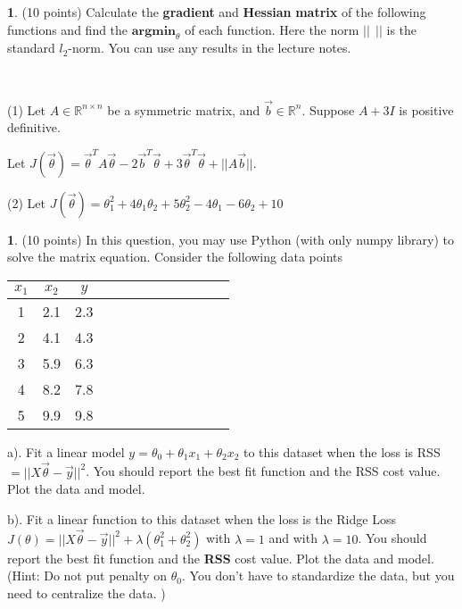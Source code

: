 \documentclass[11pt]{paper}
\theoremstyle{definition}
\newtheorem{Question}[theorem]{ }
\newcommand{\Qu}[1]{
\begin{Question}
#1
\end{Question}
\vspace{-0.5cm}
}
\newcommand{\R}{\mathbb{R}}
\newcommand{\vb}{\vec{b}}
\newcommand{\vy}{\vec{y}}
\begin{document}
 
 


\newpage
\setcounter{page}{1}

\pagestyle{plain} 

 

\Qu{(10 points)
Calculate the \textbf{gradient} and \textbf{Hessian} \textbf{matrix} of the following functions 
and find the $\textbf{argmin}_\theta$ of each function. 
Here the norm $||~ ~ ||$ is the standard $l_2$-norm. You can use any results in the lecture notes.
}

\

(1) Let  $A \in \R^{n\times n}$ be a symmetric matrix, and $\vb \in \R^n$. Suppose $A+3I$ is positive definitive.

Let $J(\vec{\theta})=\vec{\theta}^TA\vec{\theta}-  2\vb^T  \vec{\theta}+3  \vec{\theta}^T \vec{\theta} +||A\vb||$.
 
\vfill

(2)
 Let $J(\vec{\theta})= \theta_1^2+4\theta_1\theta_2 +5\theta_2^2 -4\theta_1-6\theta_2+10$

 
\vfill



\newpage

 

\Qu{ (10 points) In this question, you may use Python (with only numpy library) to solve
the matrix equation.
Consider the following data points


 \begin{tabular}{|c|c|c|c|c|c|c|c|c|c|c|c} \hline
 $x_1 $   &  $x_2 $   &  $y $      \\ \hline
 1  &   2.1   &    2.3   \\  \hline
 2   &  4.1    &   4.3   \\ \hline
 3  &   5.9    &   6.3   \\ \hline
 4  &  8.2    &   7.8  \\ \hline
 5   &  9.9   &  9.8   \\ \hline
\end{tabular}

a). Fit a linear model $y=\theta_0+\theta_1 x_1 +\theta_2x_2$ to this dataset when the loss is RSS$=||X\vec\theta-\vy||^2$. 
You should report the best fit function and the RSS cost value. Plot the data and model.

\vfill
 
b). Fit a linear function to this dataset when the loss is the Ridge Loss $J(\theta)=||X\vec\theta-\vy||^2+\lambda(\theta_1^2+\theta_2^2)$  with $\lambda=1$
and with $\lambda=10$.  You should report the best fit function and the \textbf{RSS} cost value.  Plot the data and model. (Hint: Do not put penalty on $\theta_0$. You don't have to standardize the data, but you need to centralize the data. ) 
}
\end{document}
